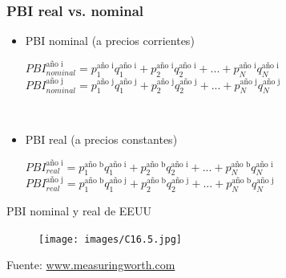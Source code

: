 \documentclass{beamer}
\begin{document}
\begin{frame}
\frametitle{PBI real vs. nominal}
\begin{itemize}
        \item PBI nominal (a precios corrientes) 
         \\ \vspace{1mm}
        \begin{center} \small{
            $PBI_{nominal}^{\text{año i}}=p_{1}^{\text{año i}}q_{1}^{\text{año i}}+p_{2}^{\text{año i}}q_{2}^{\text{año i}}+...+p_{N}^{\text{año i}}q_{N}^{\text{año i}}$}
            \\ \vspace{1mm}
            \small{
            $PBI_{nominal}^{\text{año j}}=p_{1}^{\text{año j}}q_{1}^{\text{año j}}+p_{2}^{\text{año j}}q_{2}^{\text{año j}}+...+p_{N}^{\text{año j}}q_{N}^{\text{año j}}$}
        \end{center}
         \\ \vspace{1mm}
        \item PBI real (a precios constantes) 
         \\ \vspace{1mm}
         \begin{center} \small{
            $PBI_{real}^{\text{año i}}=p_{1}^{\text{año b}}q_{1}^{\text{año i}}+p_{2}^{\text{año b}}q_{2}^{\text{año i}}+...+p_{N}^{\text{año b}}q_{N}^{\text{año i}}$}
            \\ \vspace{1mm}
            \small{
            $PBI_{real}^{\text{año j}}=p_{1}^{\text{año b}}q_{1}^{\text{año j}}+p_{2}^{\text{año b}}q_{2}^{\text{año j}}+...+p_{N}^{\text{año b}}q_{N}^{\text{año j}}$}
        \end{center}
        
\end{itemize}
\end{frame}


\begin{frame}{PBI nominal y real de EEUU}
    \begin{figure} [H]   \texttt{[image: images/C16.5.jpg]}
\label{fig:25.5}
\end{figure}
Fuente: \href{https://www.measuringworth.com/graphs/}{www.measuringworth.com}
\end{frame}
 
\end{document}
